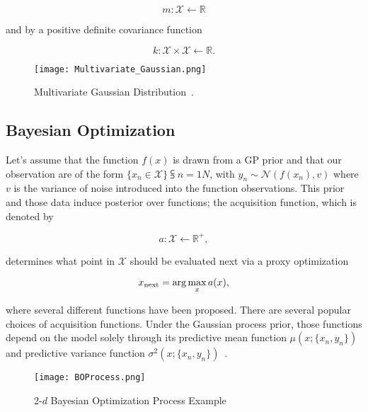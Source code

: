\begin{equation}
	m : \mathcal{X} \leftarrow \mathbb{R}
\end{equation}

and by a positive definite covariance function 

\begin{equation}
	k : \mathcal{X} \times \mathcal{X} \leftarrow \mathbb{R}.
\end{equation}

\begin{figure} [h!]
	\centering
	\texttt{[image: Multivariate\_Gaussian.png]}
	\caption{Multivariate Gaussian Distribution~\cite{MNDWikipedia}.}
	\label{fig:Multivatiate_Gaussian}
\end{figure}

\subsection{Bayesian Optimization} Let's assume that the function $f(x)$ is drawn from a GP prior and that our observation are of the form $\{x_n \in \mathcal{X}\}\subsup{}{ n=1}{N}$, with $y_n \sim \mathcal{N}(f(x_n), v)$ where $v$ is the variance of noise introduced into the function observations. This prior and those data induce  posterior over functions; the acquisition function, which is denoted by

\begin{equation}
	a : \mathcal{X} \leftarrow \mathbb{R}^+,
\end{equation}

determines what point in $\mathcal{X}$ should be evaluated next via a proxy optimization

\begin{equation}
	x\textsubscript{next} = \arg\max_{x}a(x),
\end{equation}

where several different functions have been proposed. There are several popular choices of acquisition functions. Under the Gaussian process prior, those functions depend on the model solely through its predictive mean function $\mu(x; \{x_n, y_n\})$ and predictive variance function $\sigma^2(x; \{x_n, y_n\})$~\cite{NIPS2012_4522}. 


\begin{figure} [h!]
	\centering
	\texttt{[image: BOProcess.png]}
	\caption{2-$d$ Bayesian Optimization Process Example~\cite{BayesianOptimizationImage}}
	\label{fig:BoProcess}
\end{figure}

